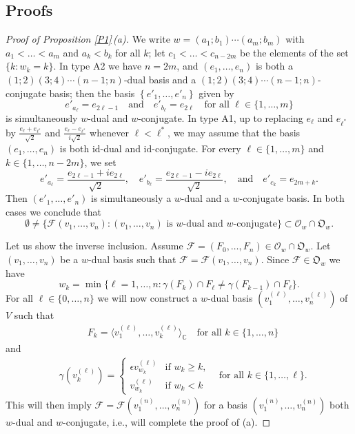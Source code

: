 \documentclass{amsart}
\theoremstyle{definition}
\begin{document}
\subsection{Proofs}

\label{S3.5}

\begin{proof}[Proof of Proposition \ref{P1}\,{\rm (a)}]
We write $w=(a_1;b_1)\cdots(a_m;b_m)$ with $a_1<\ldots<a_m$ and
$a_k<b_k$ for all $k$; let $c_1<\ldots<c_{n-2m}$ be the elements of
the set $\{k:w_k=k\}$.
In type A2 we have $n=2m$, and $(e_1,\ldots,e_n)$ is both a
$(1;2)(3;4)\cdots(n-1;n)$-dual basis and a
$(1;2)(3;4)\cdots(n-1;n)$-conjugate basis; then the basis
$\left\{e'_1,\ldots,e'_n\right\}$ given by
\[e'_{a_\ell}=e_{2\ell-1}\quad\mbox{and}\quad e'_{b_\ell}=e_{2\ell}\quad\mbox{for all $\ell\in\{1,\ldots,m\}$}\]
is simultaneously $w$-dual and $w$-conjugate.
In type A1, 
up to replacing $e_\ell$ and $e_{\ell^*}$ by $\frac{e_\ell+e_{\ell^*}}{\sqrt{2}}$ and $\frac{e_\ell-e_{\ell^*}}{i\sqrt{2}}$ whenever $\ell<\ell^*$,
we may assume that
the basis $(e_1,\ldots,e_n)$ is both $\mathrm{id}$-dual
and $\mathrm{id}$-conjugate. For every $\ell\in\{1,\ldots,m\}$ and
$k\in\{1,\ldots,n-2m\}$, we set
\[e'_{a_\ell}=\frac{e_{2\ell-1}+ie_{2\ell}}{\sqrt{2}},\quad e'_{b_\ell}=\frac{e_{2\ell-1}-ie_{2\ell}}{\sqrt{2}},\quad\mbox{and}\quad e'_{c_k}=e_{2m+k}.\]
Then $(e'_1,\ldots,e'_n)$ is simultaneously a $w$-dual and a
$w$-conjugate basis.
In both cases we conclude that
\begin{equation}
\label{3.1.4}
\emptyset\not=\{\mathcal{F}(v_1,\ldots,v_n):\mbox{$(v_1,\ldots,v_n)$ is $w$-dual and $w$-conjugate}\}\subset\mathcal{O}_w\cap\mathfrak{O}_w.
\end{equation}


Let us show the inverse inclusion. Assume
$\mathcal{F}=(F_0,\ldots,F_n)\in\mathcal{O}_w\cap\mathfrak{O}_w$.
Let $(v_1,\ldots,v_n)$ be a $w$-dual basis such that $\mathcal{F}=\mathcal{F}(v_1,\ldots,v_n)$.
Since $\mathcal{F}\in\mathfrak{O}_w$ we have
\begin{equation}
\label{1-new}
w_k=\min\{\ell=1,\ldots,n:\gamma(F_k)\cap F_\ell\not=\gamma(F_{k-1})\cap F_\ell\}.
\end{equation}
For all $\ell\in\{0,\ldots,n\}$ we will now construct a $w$-dual basis
$(v_1^{(\ell)},\ldots,v_n^{(\ell)})$ of $V$ such that
\begin{eqnarray}
\label{2-new}
& F_k=\langle v_1^{(\ell)},\ldots,v_k^{(\ell)}\rangle_\mathbb{C}
\quad\mbox{
for all $k\in\{1,\ldots,n\}$}
\end{eqnarray}
and
\begin{eqnarray}
\label{3-new}
&
\gamma(v_k^{(\ell)})=\left\{\begin{array}{ll} 
\epsilon v_{w_k}^{(\ell)} & \mbox{if $w_k\geq k$,} \\
v_{w_k}^{(\ell)} & \mbox{if $w_k<k$}
\end{array}\right.
\quad\mbox{
for all $k\in\{1,\ldots,\ell\}$.}
\end{eqnarray}
This will then imply
$\mathcal{F}=\mathcal{F}(v_1^{(n)},\ldots,v_n^{(n)})$ for a
basis $(v_1^{(n)},\ldots,v_n^{(n)})$ both $w$-dual and $w$-conjugate,
i.e., will complete the proof of (a).


\end{proof}
\end{document}
